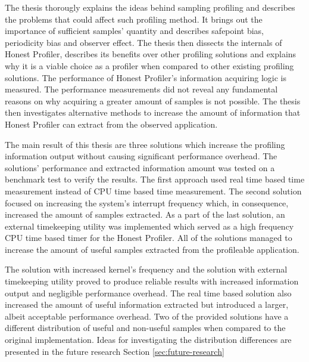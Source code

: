 \documentclass[..thesis.tex]{subfiles}
\begin{document}
The thesis thorougly explains the ideas behind sampling profiling and describes the problems that could affect such profiling method. It brings out the importance of sufficient samples' quantity and describes safepoint bias, periodicity bias and observer effect. The thesis then dissects the internals of Honest Profiler, describes its benefits over other profiling solutions and explains why it is a viable choice as a profiler when compared to other existing profiling solutions. The performance of Honest Profiler's information acquiring logic is measured. The performance measurements did not reveal any fundamental reasons on why acquiring a greater amount of samples is not possible. The thesis then investigates alternative methods to increase the amount of information that Honest Profiler can extract from the observed application.


The main result of this thesis are three solutions which increase the profiling information output without causing significant performance overhead. The solutions' performance and extracted information amount was tested on a benchmark test to verify the results. The first approach used real time based time measurement instead of CPU time based time measurement. The second solution focused on increasing the system's interrupt frequency which, in consequence, increased the amount of samples extracted. As a part of the last solution, an external timekeeping utility was implemented which served as a high frequency CPU time based timer for the Honest Profiler. All of the solutions managed to increase the amount of useful samples extracted from the profileable application.

The solution with increased kernel's frequency and the solution with external timekeeping utility proved to produce reliable results with increased information output and negligible performance overhead. The real time based solution also increased the amount of useful information extracted but introduced a larger, albeit acceptable performance overhead.
Two of the provided solutions have a different distribution of useful and non-useful samples when compared to the original implementation. Ideas for investigating the distribution differences are presented in the future research Section \ref{sec:future-research}
\end{document}
